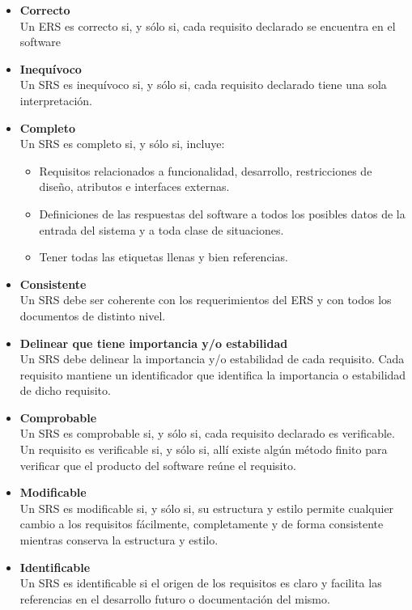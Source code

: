 \begin{itemize}
\item
	\textbf{Correcto}\\
	Un ERS es correcto si, y sólo si, cada requisito declarado se encuentra en el software
\item
	\textbf{Inequívoco}\\
	Un SRS es inequívoco si, y sólo si, cada requisito declarado tiene una sola interpretación.
\item
	\textbf{Completo}\\
	Un SRS es completo si, y sólo si, incluye: 
		\begin{itemize}
		\item
			Requisitos relacionados a funcionalidad, desarrollo, restricciones
de diseño, atributos e interfaces externas.
		\item
			 Definiciones de las respuestas del software a todos los posibles datos de la entrada del sistema y a toda clase de situaciones.
		\item
			 Tener todas las etiquetas llenas y bien referencias. 
		\end{itemize}
\item
	\textbf{Consistente}\\
	Un SRS debe ser coherente con los requerimientos del ERS y con todos los documentos de distinto nivel.
\item
	\textbf{Delinear que tiene importancia y/o estabilidad}\\
	Un SRS debe delinear la importancia y/o estabilidad de cada requisito. Cada requisito mantiene un identificador que identifica la importancia o estabilidad de dicho requisito. 
\item
	\textbf{Comprobable}\\
	Un SRS es comprobable si, y sólo si, cada requisito declarado es verificable. 
	Un requisito es verificable si, y sólo si, allí existe algún método finito para verificar que el producto del software reúne el requisito.
\item
	\textbf{Modificable}\\
	Un SRS es modificable si, y sólo si, su estructura y estilo permite cualquier cambio a los requisitos fácilmente, completamente y de forma consistente mientras conserva la estructura y estilo.
\item
	\textbf{Identificable}\\
	Un SRS es identificable si el origen de los requisitos es claro y facilita las referencias en el desarrollo futuro o documentación del mismo. 
\end{itemize}

